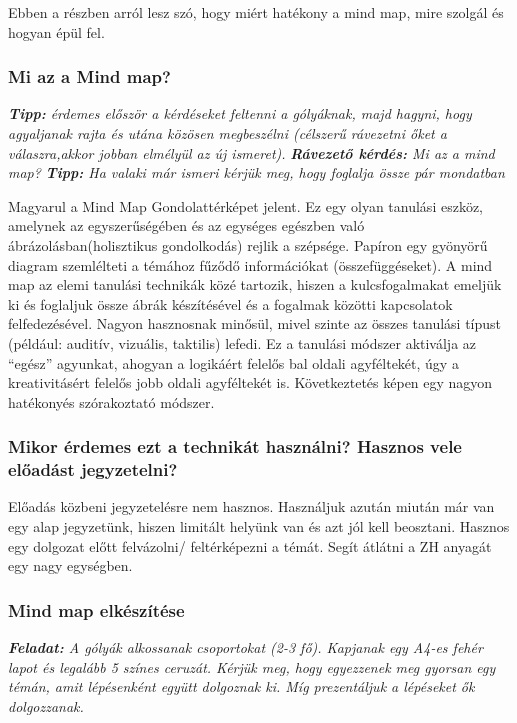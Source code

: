 \documentclass[../Main.tex]{subfiles}
\begin{document}
Ebben a részben arról lesz szó, hogy miért hatékony a mind map, mire szolgál és hogyan épül fel.

\subsubsection{Mi az a Mind map?}

\textit{\textbf{Tipp:} érdemes először a kérdéseket feltenni a gólyáknak, majd hagyni,
 hogy agyaljanak rajta és utána közösen megbeszélni 
(célszerű rávezetni őket a válaszra,akkor jobban elmélyül az új ismeret).} \newline
 \textit{\textbf{Rávezető kérdés:} Mi az a mind map?} \newline
\textit{\textbf{Tipp:} Ha valaki már ismeri kérjük meg, hogy foglalja össze pár mondatban}

Magyarul a Mind Map Gondolattérképet jelent. Ez egy olyan tanulási eszköz, amelynek az egyszerűségében és
az egységes egészben való ábrázolásban(holisztikus gondolkodás) rejlik a szépsége. Papíron egy gyönyörű
diagram szemlélteti a témához fűződő információkat (összefüggéseket).
A mind map az elemi tanulási technikák közé tartozik, hiszen a kulcsfogalmakat emeljük ki
és foglaljuk össze ábrák készítésével és a fogalmak közötti kapcsolatok felfedezésével.
Nagyon hasznosnak minősül, mivel szinte az összes tanulási típust (például: auditív, vizuális, taktilis) lefedi.
Ez a tanulási módszer aktiválja az “egész” agyunkat, ahogyan a logikáért felelős bal oldali agyféltekét,
úgy a kreativitásért felelős jobb oldali agyféltekét is. Következtetés képen egy nagyon hatékonyés szórakoztató módszer.

\subsubsection{Mikor érdemes ezt a technikát használni? \newline Hasznos vele előadást jegyzetelni?}

Előadás közbeni jegyzetelésre nem hasznos.
Használjuk azután miután már van egy alap jegyzetünk, hiszen limitált helyünk van és azt jól kell beosztani.
    Hasznos egy dolgozat előtt felvázolni/ feltérképezni a témát. Segít átlátni a ZH anyagát egy nagy egységben.

\subsubsection{Mind map elkészítése}

\textit{\textbf{Feladat:} A gólyák alkossanak csoportokat (2-3 fő).
Kapjanak egy A4-es fehér lapot és legalább 5 színes ceruzát.
Kérjük meg, hogy egyezzenek meg gyorsan egy témán, amit lépésenként együtt dolgoznak ki.
Míg prezentáljuk a lépéseket ők dolgozzanak.}
\end{document}
